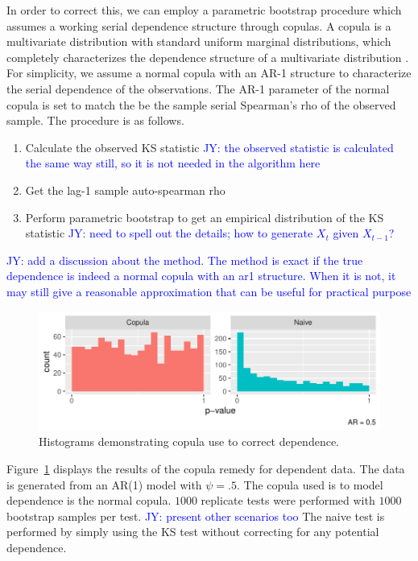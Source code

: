 \documentclass[12pt, letterpaper, titlepage]{article}
\newcommand{\jy}[1]{\textcolor{blue}{JY: #1}}
\begin{document}
In order to correct this, we can employ a parametric bootstrap procedure which
assumes a working serial dependence structure through copulas. A copula is a
multivariate distribution with standard uniform marginal distributions, which
completely characterizes the dependence structure of a multivariate
distribution \cite{copula, book}. For simplicity, we assume a normal copula with
an AR-1 structure to characterize the serial dependence of the observations. The
AR-1 parameter of the normal copula is set to match the be the sample serial
Spearman's rho of the observed sample. The procedure is as follows.


\begin{enumerate}
  \item Calculate the observed KS statistic \jy{the observed statistic is
      calculated the same way still, so it is not needed in the algorithm here}
  \item Get the lag-1 sample auto-spearman rho
  \item Perform parametric bootstrap to get an empirical distribution of the KS
    statistic
    \jy{need to spell out the details; how to generate $X_t$ given $X_{t-1}$?}
\end{enumerate}


\jy{add a discussion about the method. The method is exact if the true
  dependence is indeed a normal copula with an ar1 structure. When it is not, it
  may still give a reasonable approximation that can be useful for practical purpose}

\begin{figure}[tbp]
  \centering
  \includegraphics{hist_copula_only}
  \caption{Histograms demonstrating copula use to correct dependence.}
  \label{fig:hist_copula_only}
\end{figure}

Figure~\ref{fig:hist_copula_only} displays the results of the copula remedy for dependent data.
The data is generated from an AR(1) model with $\psi = .5$. The copula used is to model
dependence is the normal copula. $1000$ replicate tests were performed with
$1000$ bootstrap samples per test.
\jy{present other scenarios too}
The naive test is performed by simply using the KS test without correcting for any 
potential dependence.
\end{document}
